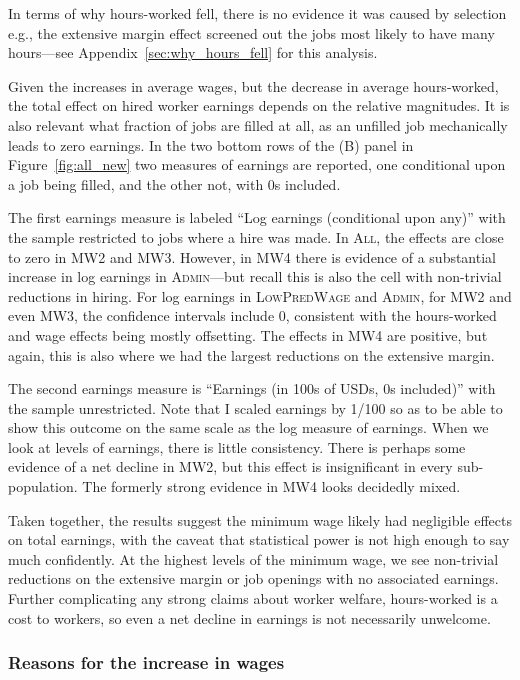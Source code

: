 \documentclass[AER]{AEA}
\newcommand{\all}{\textsc{All}}
\newcommand{\admin}{\textsc{Admin}}
\newcommand{\lpw}{\textsc{LowPredWage}}
\begin{document}
In terms of why hours-worked fell, there is no evidence it was caused by selection e.g., the extensive margin effect screened out the jobs most likely to have many hours---see Appendix~\ref{sec:why_hours_fell} for this analysis.


Given the increases in average wages, but the decrease in average hours-worked, the total effect on hired worker earnings depends on the relative magnitudes.
It is also relevant what fraction of jobs are filled at all, as an unfilled job mechanically leads to zero earnings.
In the two bottom rows of the (B) panel in Figure~\ref{fig:all_new} two measures of earnings are reported, one conditional upon a job being filled, and the other not, with 0s included.


The first earnings measure is labeled ``Log earnings (conditional upon any)'' with the sample restricted to jobs where a hire was made.
In \all{}, the effects are close to zero in MW2 and MW3.
However, in MW4 there is evidence of a substantial increase in log earnings in \admin{}---but recall this is also the cell with non-trivial reductions in hiring. %
For log earnings in \lpw{} and \admin{}, for MW2 and even MW3, the confidence intervals include 0, consistent with the hours-worked and wage effects being mostly offsetting.
The effects in MW4 are positive, but again, this is also where we had the largest reductions on the extensive margin.

The second earnings measure is ``Earnings (in 100s of USDs, 0s included)'' with the sample unrestricted.
Note that I scaled earnings by 1/100 so as to be able to show this outcome on the same scale as the log measure of earnings.
When we look at levels of earnings, there is little consistency.
There is perhaps some evidence of a net decline in MW2, but this effect is insignificant in every sub-population.
The formerly strong evidence in MW4 looks decidedly mixed.


Taken together, the results suggest the minimum wage likely had negligible effects on total earnings, with the caveat that statistical power is not high enough to say much confidently.
At the highest levels of the minimum wage, we see non-trivial reductions on the extensive margin or job openings with no associated earnings.
Further complicating any strong claims about worker welfare, hours-worked is a cost to workers, so even a net decline in earnings is not necessarily unwelcome.

\subsubsection{Reasons for the increase in wages} 
\end{document}
